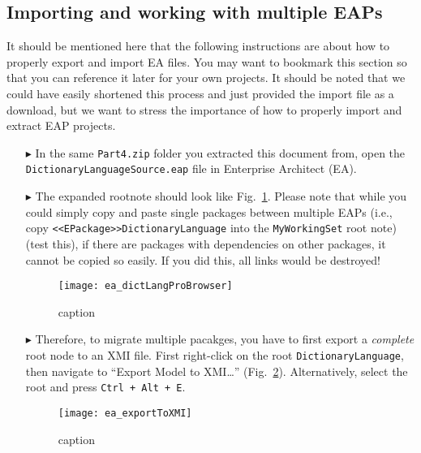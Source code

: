 \newpage
\subsection{Importing and working with multiple EAPs}
\visHeader
\label{sec:multiEAP}

It should be mentioned here that the following instructions are about how to properly export and import EA files. You may want to bookmark this section so that
you can reference it later for your own projects. It should be noted that we could have easily shortened this process and just provided the import file as a
download, but we want to stress the importance of how to properly import and extract EAP projects.

\begin{itemize}

\item[$\blacktriangleright$] In the same \texttt{Part4.zip} folder you extracted this document from, open the \texttt{DictionaryLanguageSource.eap} file in
Enterprise Architect (EA). %

\item[$\blacktriangleright$] The expanded rootnote should look like Fig.~\ref{fig:dictionaryLangStart}. Please note that while you could simply copy and paste
single packages between multiple EAPs (i.e., copy \texttt{<<EPackage>>DictionaryLanguage} into the \texttt{MyWorkingSet} root note)(\update test this), if there
are packages with dependencies on other packages, it cannot be copied so easily. If you did this, all links would be destroyed!

\begin{figure}[htbp]
\begin{center}
  \texttt{[image: ea\_dictLangProBrowser]}
  \caption{caption}
  \label{fig:dictionaryLangStart}
\end{center}
\end{figure}

\item[$\blacktriangleright$] Therefore, to migrate multiple pacakges, you have to first export a \emph{complete} root node to an XMI file. First right-click on
the root \texttt{DictionaryLanguage}, then navigate to ``Export Model to XMI\ldots'' (Fig.~\ref{fig:contextExport}). Alternatively, select the root and press
\texttt{Ctrl + Alt + E}.

\begin{figure}[htbp]
\begin{center}
  \texttt{[image: ea\_exportToXMI]}
  \caption{caption}
  \label{fig:contextExport}
\end{center}
\end{figure}


\end{itemize}
